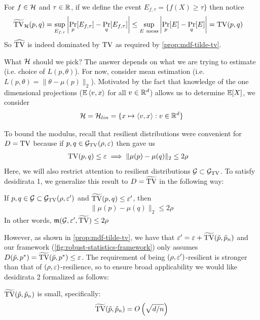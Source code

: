 \begin{remark}
    For $f \in \mathcal{H}$ and $\tau \in \mathbb{R}$, if we define the event
    $E_{f,\tau} = \{f(X) \geq \tau\}$ then notice
    \begin{align}
        \widetilde{\operatorname{TV}}_{\mathcal{H}}(p,q)
        = \sup_{E_{f,\tau}} \left\lvert
            \Pr_p[E_{f,\tau}] - \Pr_q[E_{f,\tau}]
        \right\rvert
        &\leq \sup_{E~\text{meas}} \left\lvert
            \Pr_p[E] - \Pr_q[E]
        \right\rvert
        = \operatorname{TV}(p,q)
    \end{align}
    So $\widehat{\operatorname{TV}}$ is indeed dominated by $\operatorname{TV}$ as required by
    \cref{prop:mdf-tilde-tv}.
\end{remark}


What $\mathcal{H}$ should we pick? The answer depends on what we are trying to estimate
(i.e. choice of $L(p, \theta)$). For now, consider mean estimation
(i.e. $L(p,\theta) = \|\theta - \mu(p)\|_2$).
Motivated by the fact that knowledge of the one dimensional
projections ($\mathbb{E}\braket{v,x}$ for all $v \in \mathbb{R}^d$) allows us to determine
$\mathbb{E}[X]$, we consider
\begin{align}
    \mathcal{H} = \mathcal{H}_{lin} = \{ x \mapsto \braket{v, x} : v \in \mathbb{R}^d \}
\end{align}

To bound the modulus, recall that resilient distributions were convenient for $D = \operatorname{TV}$ because
if $p, q \in \mathcal{G}_{\operatorname{TV}}(\rho, \varepsilon)$ then  gave us
\begin{align}
    \operatorname{TV}(p, q) \leq \varepsilon &\implies \|\mu(p) - \mu(q)\|_2 \leq 2 \rho
\end{align}
Here, we will also restrict attention to resilient distributions $\mathcal{G} \subset \mathcal{G}_{\operatorname{TV}}$.
To satisfy desidirata 1, we generalize this result to $D = \widetilde{\operatorname{TV}}$ in
the following way:
\begin{proposition}\label{eq:9-12-desidirata-1}
    If $p,q \in \mathcal{G} \subset \mathcal{G}_{\operatorname{TV}}(\rho, \varepsilon')$ and $\widetilde{\operatorname{TV}}(p,q) \leq \varepsilon'$, then
    \begin{align}
        \|\mu(p) - \mu(q)\|_2 \leq 2 \rho
    \end{align}
    In other words, $\mathfrak{m}(\mathcal{G}, \varepsilon', \widetilde{\operatorname{TV}}) \leq 2 \rho$
\end{proposition}

However, as shown in \cref{prop:mdf-tilde-tv}, we have that
$\varepsilon' = \varepsilon + \widetilde{\operatorname{TV}}(\tilde{p},\tilde{p}_n)$
and our framework (\cref{fig:robust-statistics-framework}) only assumes
$D(\tilde{p}, p^*) = \widetilde{\operatorname{TV}}(\tilde{p}, p^*) \leq \varepsilon$.
The requirement of being $(\rho, \varepsilon')$-resilient is stronger than that of
$(\rho, \varepsilon)$-resilience, so to ensure broad applicability we would like
desidirata 2 formalized as follows:
\begin{proposition}\label{eq:9-12-desidirata-2}
    $\widetilde{\operatorname{TV}}(\tilde{p}, \tilde{p}_n)$ is small, specifically:
    \begin{align}
        \widetilde{\operatorname{TV}}(\tilde{p}, \tilde{p}_n) = O\left(\sqrt{d/n}\right)
    \end{align}
\end{proposition}


